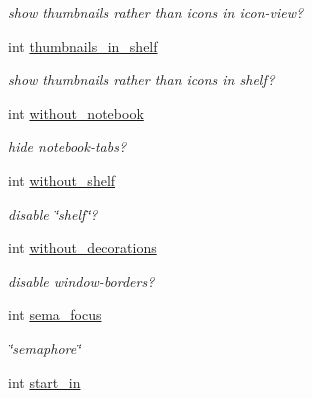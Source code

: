 \begin{CompactItemize}
\begin{CompactList}\small\item\em show thumbnails rather than icons in icon-view? \item\end{CompactList}\item 
\hypertarget{struct__noir__sess_o7}{
int \hyperlink{struct__noir__sess_o7}{thumbnails\_\-in\_\-shelf}}
\label{struct__noir__sess_o7}

\begin{CompactList}\small\item\em show thumbnails rather than icons in shelf? \item\end{CompactList}\item 
\hypertarget{struct__noir__sess_o8}{
int \hyperlink{struct__noir__sess_o8}{without\_\-notebook}}
\label{struct__noir__sess_o8}

\begin{CompactList}\small\item\em hide notebook-tabs? \item\end{CompactList}\item 
\hypertarget{struct__noir__sess_o9}{
int \hyperlink{struct__noir__sess_o9}{without\_\-shelf}}
\label{struct__noir__sess_o9}

\begin{CompactList}\small\item\em disable \char`\"{}shelf\char`\"{}? \item\end{CompactList}\item 
\hypertarget{struct__noir__sess_o10}{
int \hyperlink{struct__noir__sess_o10}{without\_\-decorations}}
\label{struct__noir__sess_o10}

\begin{CompactList}\small\item\em disable window-borders? \item\end{CompactList}\item 
\hypertarget{struct__noir__sess_o11}{
int \hyperlink{struct__noir__sess_o11}{sema\_\-focus}}
\label{struct__noir__sess_o11}

\begin{CompactList}\small\item\em \char`\"{}semaphore\char`\"{} \item\end{CompactList}\item 
\hypertarget{struct__noir__sess_o12}{
int \hyperlink{struct__noir__sess_o12}{start\_\-in}}
\label{struct__noir__sess_o12}


\end{CompactItemize}
